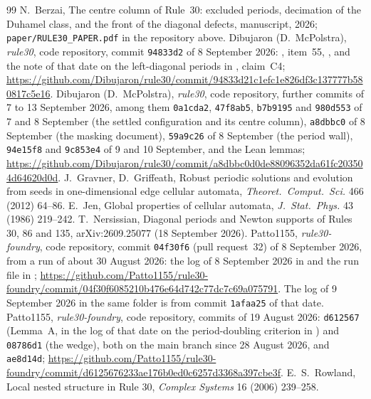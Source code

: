 \documentclass[11pt]{article}
\theoremstyle{definition}
\theoremstyle{remark}
\begin{document}
\begin{thebibliography}{99}
 N.~Berzai, The centre column of Rule~30: excluded periods, decimation of the Duhamel class, and the front of the diagonal defects, manuscript, 2026; \texttt{paper/RULE30\_PAPER.pdf} in the repository above.
 Dibujaron (D.~McPolstra), \emph{rule30}, code repository, commit \texttt{94833d2} of 8 September 2026: , item~55, , and the note of that date on the left-diagonal periods in , claim~C4; \url{https://github.com/Dibujaron/rule30/commit/94833d21c1efc1e826df3c137777b580817c5e16}.
 Dibujaron (D.~McPolstra), \emph{rule30}, code repository, further commits of 7 to 13 September 2026, among them \texttt{0a1cda2}, \texttt{47f8ab5}, \texttt{b7b9195} and \texttt{980d553} of 7 and 8 September (the settled configuration and its centre column), \texttt{a8dbbc0} of 8 September (the masking document), \texttt{59a9c26} of 8 September (the period wall), \texttt{94e15f8} and \texttt{9c853e4} of 9 and 10 September, and the Lean lemmas; \url{https://github.com/Dibujaron/rule30/commit/a8dbbc0d0de88096352da61fc203504d64620d0d}.
 J.~Gravner, D.~Griffeath, Robust periodic solutions and evolution from seeds in one-dimensional edge cellular automata, \emph{Theoret.\ Comput.\ Sci.} 466 (2012) 64--86.
 E.~Jen, Global properties of cellular automata, \emph{J.\ Stat.\ Phys.} 43 (1986) 219--242.
 T.~Nersissian, Diagonal periods and Newton supports of Rules 30, 86 and 135, arXiv:2609.25077 (18 September 2026).
 Patto1155, \emph{rule30-foundry}, code repository, commit \texttt{04f30f6} (pull request~32) of 8 September 2026, from a run of about 30 August 2026: the log of 8 September 2026 in  and the run file in ; \url{https://github.com/Patto1155/rule30-foundry/commit/04f30f6085210b476e64d742c77dc7c69a075791}. The log of 9 September 2026 in the same folder is from commit \texttt{1afaa25} of that date.
 Patto1155, \emph{rule30-foundry}, code repository, commits of 19 August 2026: \texttt{d612567} (Lemma~A, in the log of that date on the period-doubling criterion in ) and \texttt{08786d1} (the wedge), both on the main branch since 28 August 2026, and \texttt{ae8d14d}; \url{https://github.com/Patto1155/rule30-foundry/commit/d6125676233ae176b0ed0c6257d3368a397cbe3f}.
 E.~S.~Rowland, Local nested structure in Rule 30, \emph{Complex Systems} 16 (2006) 239--258.

\end{thebibliography}
\end{document}
